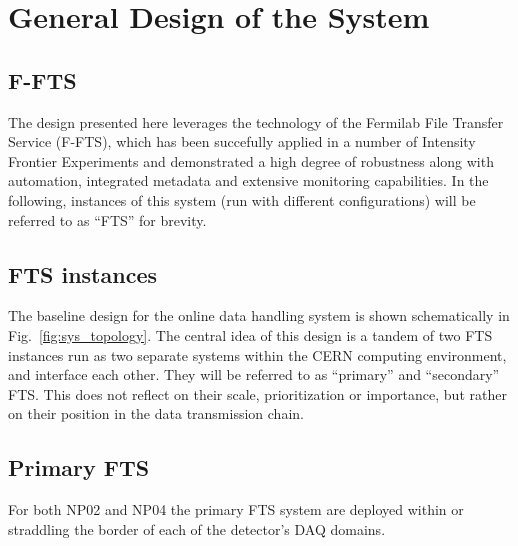 \documentclass[pdftex,12pt,letter]{article}
\newcommand{\pd}{protoDUNE\ }
\begin{document}

\section{General Design of the System}
\subsection{F-FTS}
The design presented here leverages the technology of the Fermilab File Transfer Service (F-FTS), which has been succefully applied
in a number of Intensity Frontier Experiments and demonstrated a high degree of robustness along with automation, integrated metadata
and extensive monitoring capabilities. In the following, instances of this system (run with different configurations) will be referred to
as ``FTS'' for brevity.

\subsection{FTS instances}
The baseline design for the online data handling system is shown schematically in Fig.~\ref{fig:sys_topology}.
The central idea of this design is a tandem of two FTS instances run as two separate systems within the CERN
computing environment, and interface each other. They will be referred to as ``primary'' and ``secondary'' FTS.
This does not reflect on their scale, prioritization or importance, but rather on their position in the data transmission chain.

\subsection{Primary FTS}
For both NP02 and NP04 the primary FTS system are deployed within or straddling the border
of each of the detector’s DAQ domains.
\end{document}
